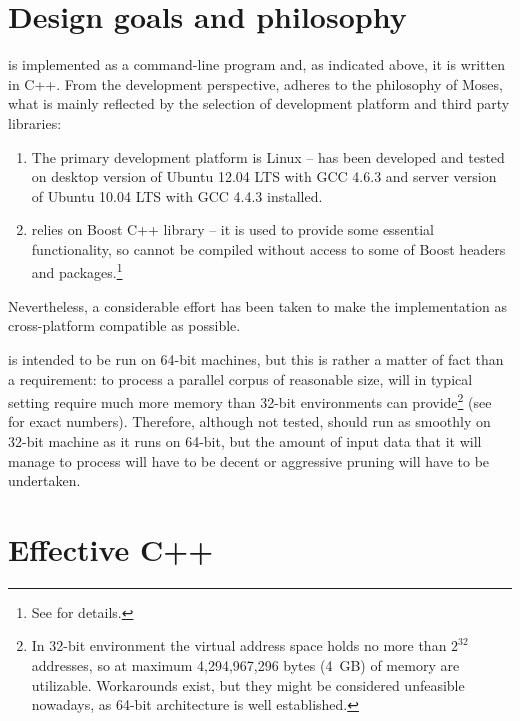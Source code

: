 \section{Design goals and philosophy}


\Eppex{} is implemented as a command-line program and, as indicated above, it is written in C++.
From the development perspective, \eppex{} adheres to the philosophy of Moses, what is mainly
reflected by the selection of development platform and third party libraries:
\begin{enumerate}
  \item The primary development platform is Linux --
  \eppex{} has been developed and tested on desktop version of Ubuntu 12.04 LTS with GCC 4.6.3 and
  server version of Ubuntu 10.04 LTS with GCC 4.4.3 installed. %
  \item \Eppex{} relies on Boost C++ library -- it is used to provide
  some essential functionality, so \eppex{} cannot be compiled without access to some of Boost
  headers and packages.\footnote{See  for details.}
\end{enumerate}
Nevertheless, a considerable effort has been taken to make the implementation as cross-platform
compatible as possible.

\Eppex{} is intended to be run on 64-bit machines, but this is rather a matter of fact than
a requirement: to process a parallel corpus of reasonable size, \eppex{} will in typical
setting require much more memory than 32-bit environments can provide\footnote{In 32-bit
environment the virtual address space holds no more than $2^{32}$ addresses, so at maximum
4,294,967,296 bytes (4~GB) of memory are utilizable. Workarounds exist, but they might be
considered unfeasible nowadays, as 64-bit architecture is well established.} (see 
for exact numbers).
Therefore, although not tested, \eppex{} should run as smoothly on 32-bit machine as it runs
on 64-bit, but the amount of input data that it will manage to process will have to be decent
or aggressive pruning will have to be undertaken.

\section{Effective C++}

